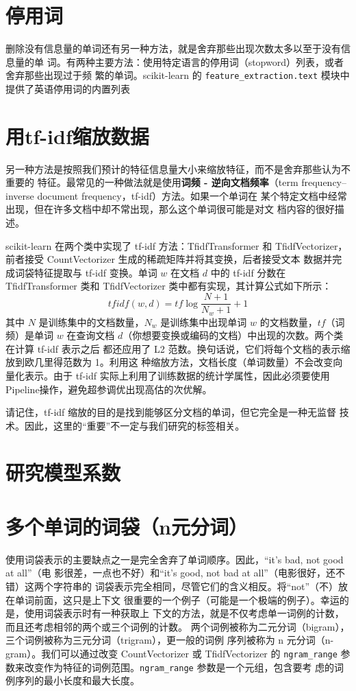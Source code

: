 \section{停用词}
删除没有信息量的单词还有另一种方法，就是舍弃那些出现次数太多以至于没有信息量的单
词。有两种主要方法：使用特定语言的停用词（stopword）列表，或者舍弃那些出现过于频
繁的单词。scikit-learn 的 \verb|feature_extraction.text| 模块中提供了英语停用词的内置列表
\section{用tf-idf缩放数据}
另一种方法是按照我们预计的特征信息量大小来缩放特征，而不是舍弃那些认为不重要的
特征。最常见的一种做法就是使用\textbf{词频 - 逆向文档频率}（term frequency–inverse document
frequency，tf-idf）方法。如果一个单词在
某个特定文档中经常出现，但在许多文档中却不常出现，那么这个单词很可能是对文
档内容的很好描述。

scikit-learn 在两个类中实现了 tf-idf 方法：TfidfTransformer 和
TfidfVectorizer，前者接受 CountVectorizer 生成的稀疏矩阵并将其变换，后者接受文本
数据并完成词袋特征提取与 tf-idf 变换。单词 $w$ 在文档 $d$ 中的 tf-idf 分数在
TfidfTransformer 类和 TfidfVectorizer 类中都有实现，其计算公式如下所示：
\begin{equation*}
    tfidf(w, d)=tf \log{\frac{N+1}{N_w+1}}+1
\end{equation*}
其中 $N$ 是训练集中的文档数量，$N_w$ 是训练集中出现单词 $w$ 的文档数量，$tf$（词频）是单词
$w$ 在查询文档 $d$（你想要变换或编码的文档）中出现的次数。两个类在计算 tf-idf 表示之后
都还应用了 L2 范数。换句话说，它们将每个文档的表示缩放到欧几里得范数为 1。利用这
种缩放方法，文档长度（单词数量）不会改变向量化表示。由于 tf-idf 实际上利用了训练数据的统计学属性，因此必须要使用Pipeline操作，避免超参调优出现高估的次优解。

请记住，tf-idf 缩放的目的是找到能够区分文档的单词，但它完全是一种无监督
技术。因此，这里的“重要”不一定与我们研究的标签相关。
\section{研究模型系数}
\section{多个单词的词袋（n元分词）}
使用词袋表示的主要缺点之一是完全舍弃了单词顺序。因此，“it’s bad, not good at all”（电
影很差，一点也不好）和“it’s good, not bad at all”（电影很好，还不错）这两个字符串的
词袋表示完全相同，尽管它们的含义相反。将“not”（不）放在单词前面，这只是上下文
很重要的一个例子（可能是一个极端的例子）。幸运的是，使用词袋表示时有一种获取上
下文的方法，就是不仅考虑单一词例的计数，而且还考虑相邻的两个或三个词例的计数。
两个词例被称为二元分词（bigram），三个词例被称为三元分词（trigram），更一般的词例
序列被称为 n 元分词（n-gram）。我们可以通过改变 CountVectorizer 或 TfidfVectorizer
的 \verb|ngram_range| 参数来改变作为特征的词例范围。\verb|ngram_range| 参数是一个元组，包含要考
虑的词例序列的最小长度和最大长度。

